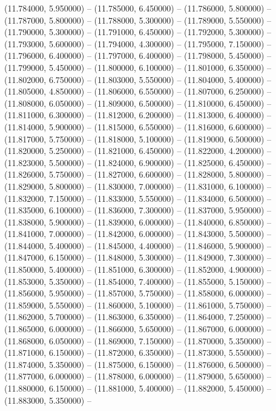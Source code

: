 (11.784000, 5.950000) -- 
(11.785000, 6.450000) -- 
(11.786000, 5.800000) -- 
(11.787000, 5.800000) -- 
(11.788000, 5.300000) -- 
(11.789000, 5.550000) -- 
(11.790000, 5.300000) -- 
(11.791000, 6.450000) -- 
(11.792000, 5.300000) -- 
(11.793000, 5.600000) -- 
(11.794000, 4.300000) -- 
(11.795000, 7.150000) -- 
(11.796000, 6.400000) -- 
(11.797000, 6.400000) -- 
(11.798000, 5.450000) -- 
(11.799000, 5.450000) -- 
(11.800000, 6.100000) -- 
(11.801000, 6.350000) -- 
(11.802000, 6.750000) -- 
(11.803000, 5.550000) -- 
(11.804000, 5.400000) -- 
(11.805000, 4.850000) -- 
(11.806000, 6.550000) -- 
(11.807000, 6.250000) -- 
(11.808000, 6.050000) -- 
(11.809000, 6.500000) -- 
(11.810000, 6.450000) -- 
(11.811000, 6.300000) -- 
(11.812000, 6.200000) -- 
(11.813000, 6.400000) -- 
(11.814000, 5.900000) -- 
(11.815000, 6.550000) -- 
(11.816000, 6.600000) -- 
(11.817000, 5.750000) -- 
(11.818000, 5.100000) -- 
(11.819000, 6.500000) -- 
(11.820000, 5.250000) -- 
(11.821000, 6.450000) -- 
(11.822000, 4.200000) -- 
(11.823000, 5.500000) -- 
(11.824000, 6.900000) -- 
(11.825000, 6.450000) -- 
(11.826000, 5.750000) -- 
(11.827000, 6.600000) -- 
(11.828000, 5.800000) -- 
(11.829000, 5.800000) -- 
(11.830000, 7.000000) -- 
(11.831000, 6.100000) -- 
(11.832000, 7.150000) -- 
(11.833000, 5.550000) -- 
(11.834000, 6.500000) -- 
(11.835000, 6.100000) -- 
(11.836000, 7.300000) -- 
(11.837000, 5.950000) -- 
(11.838000, 5.900000) -- 
(11.839000, 6.000000) -- 
(11.840000, 6.850000) -- 
(11.841000, 7.000000) -- 
(11.842000, 6.000000) -- 
(11.843000, 5.500000) -- 
(11.844000, 5.400000) -- 
(11.845000, 4.400000) -- 
(11.846000, 5.900000) -- 
(11.847000, 6.150000) -- 
(11.848000, 5.300000) -- 
(11.849000, 7.300000) -- 
(11.850000, 5.400000) -- 
(11.851000, 6.300000) -- 
(11.852000, 4.900000) -- 
(11.853000, 5.350000) -- 
(11.854000, 7.400000) -- 
(11.855000, 5.150000) -- 
(11.856000, 5.950000) -- 
(11.857000, 5.750000) -- 
(11.858000, 6.000000) -- 
(11.859000, 5.550000) -- 
(11.860000, 5.100000) -- 
(11.861000, 5.750000) -- 
(11.862000, 5.700000) -- 
(11.863000, 6.350000) -- 
(11.864000, 7.250000) -- 
(11.865000, 6.000000) -- 
(11.866000, 5.650000) -- 
(11.867000, 6.000000) -- 
(11.868000, 6.050000) -- 
(11.869000, 7.150000) -- 
(11.870000, 5.350000) -- 
(11.871000, 6.150000) -- 
(11.872000, 6.350000) -- 
(11.873000, 5.550000) -- 
(11.874000, 5.350000) -- 
(11.875000, 6.150000) -- 
(11.876000, 6.500000) -- 
(11.877000, 6.000000) -- 
(11.878000, 6.000000) -- 
(11.879000, 5.650000) -- 
(11.880000, 6.150000) -- 
(11.881000, 5.400000) -- 
(11.882000, 5.450000) -- 
(11.883000, 5.350000) -- 
